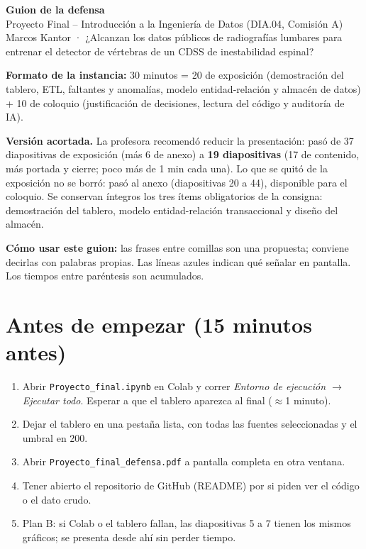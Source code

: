 \documentclass[11pt,a4paper]{article}
\begin{document}
\begin{center}
{\Huge\bfseries\color{itba}Guion de la defensa}\\[0.6em]
Proyecto Final -- Introducción a la Ingeniería de Datos (DIA.04, Comisión A)\\[0.4em]
Marcos Kantor · ¿Alcanzan los datos públicos de radiografías lumbares para entrenar el detector de vértebras de un CDSS de inestabilidad espinal?
\end{center}

\textbf{Formato de la instancia:} 30 minutos = 20 de exposición (demostración del tablero, ETL, faltantes y anomalías, modelo entidad-relación y almacén de datos) + 10 de coloquio (justificación de decisiones, lectura del código y auditoría de IA).

\textbf{Versión acortada.} La profesora recomendó reducir la presentación: pasó de 37 diapositivas de exposición (más 6 de anexo) a \textbf{19 diapositivas} (17 de contenido, más portada y cierre; poco más de 1 min cada una). Lo que se quitó de la exposición no se borró: pasó al anexo (diapositivas 20 a 44), disponible para el coloquio. Se conservan íntegros los tres ítems obligatorios de la consigna: demostración del tablero, modelo entidad-relación transaccional y diseño del almacén.

\textbf{Cómo usar este guion:} las frases entre comillas son una propuesta; conviene decirlas con palabras propias. Las líneas azules indican qué señalar en pantalla. Los tiempos entre paréntesis son acumulados.

\section*{Antes de empezar (15 minutos antes)}
\begin{enumerate}\setlength{\itemsep}{0.2em}
\item Abrir \texttt{Proyecto\_final.ipynb} en Colab y correr \emph{Entorno de ejecución $\to$ Ejecutar todo}. Esperar a que el tablero aparezca al final ($\approx$1 minuto).
\item Dejar el tablero en una pestaña lista, con todas las fuentes seleccionadas y el umbral en 200.
\item Abrir \texttt{Proyecto\_final\_defensa.pdf} a pantalla completa en otra ventana.
\item Tener abierto el repositorio de GitHub (README) por si piden ver el código o el dato crudo.
\item Plan B: si Colab o el tablero fallan, las diapositivas 5 a 7 tienen los mismos gráficos; se presenta desde ahí sin perder tiempo.
\end{enumerate}
\end{document}
